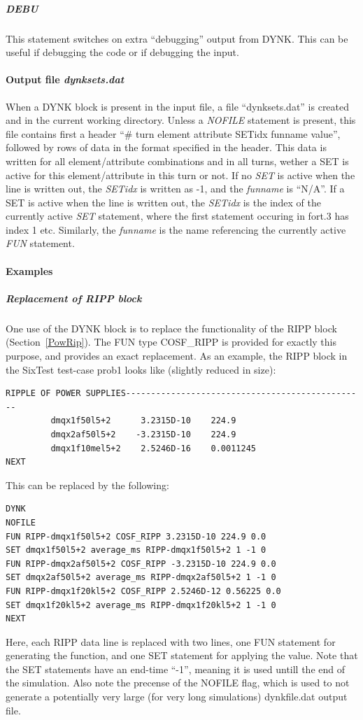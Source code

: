 \documentclass[a4paper,11pt]{report}
\begin{document}
\subparagraph{DEBU}
This statement switches on extra ``debugging'' output from DYNK.
This can be useful if debugging the code or if debugging the input.

\paragraph{Output file \emph{dynksets.dat}}
When a DYNK block is present in the input file, a file ``dynksets.dat'' is created and in the current working directory.
Unless a \emph{NOFILE} statement is present, this file contains first a header ``\# turn element attribute SETidx funname value'', followed by rows of data in the format specified in the header.
This data is written for all element/attribute combinations and in all turns, wether a SET is active for this element/attribute in this turn or not.
If no \emph{SET} is active when the line is written out, the \emph{SETidx} is written as -1, and the \emph{funname} is ``N/A''.
If a SET is active when the line is written out, the \emph{SETidx} is the index of the currently active \emph{SET} statement, where the first statement occuring in fort.3 has index 1 etc.
Similarly, the \emph{funname} is the name referencing the currently active \emph{FUN} statement.

\paragraph{Examples}

\subparagraph{Replacement of RIPP block}
One use of the DYNK block is to replace the functionality of the RIPP block (Section~\ref{PowRip}).
The FUN type COSF\_RIPP is provided for exactly this purpose, and provides an exact replacement.
As an example, the RIPP block in the SixTest test-case prob1 looks like (slightly reduced in size):
\begin{verbatim}
RIPPLE OF POWER SUPPLIES------------------------------------------------
         dmqx1f50l5+2      3.2315D-10    224.9
         dmqx2af50l5+2    -3.2315D-10    224.9
         dmqx1f10mel5+2    2.5246D-16    0.0011245
NEXT
\end{verbatim}
This can be replaced by the following:
\begin{verbatim}
DYNK
NOFILE
FUN RIPP-dmqx1f50l5+2 COSF_RIPP 3.2315D-10 224.9 0.0
SET dmqx1f50l5+2 average_ms RIPP-dmqx1f50l5+2 1 -1 0
FUN RIPP-dmqx2af50l5+2 COSF_RIPP -3.2315D-10 224.9 0.0
SET dmqx2af50l5+2 average_ms RIPP-dmqx2af50l5+2 1 -1 0
FUN RIPP-dmqx1f20kl5+2 COSF_RIPP 2.5246D-12 0.56225 0.0
SET dmqx1f20kl5+2 average_ms RIPP-dmqx1f20kl5+2 1 -1 0
NEXT
\end{verbatim}
Here, each RIPP data line is replaced with two lines, one FUN statement for generating the function, and one SET statement for applying the value.
Note that the SET statements have an end-time ``-1'', meaning it is used untill the end of the simulation.
Also note the precense of the NOFILE flag, which is used to not generate a potentially very large (for very long simulations) dynkfile.dat output file.
\end{document}
